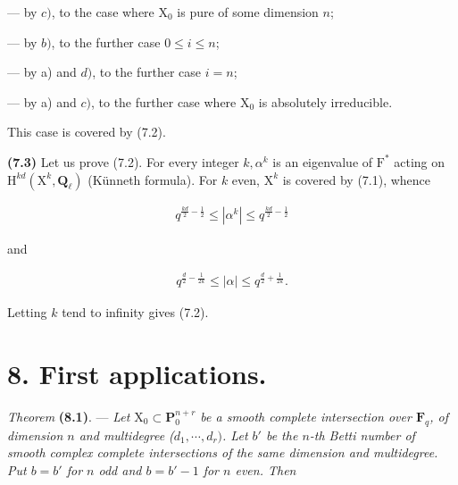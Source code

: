 \documentclass[10pt,leqno]{article}
\begin{document}
\noindent — by \(c)\), to the case where \(\mathrm{X}_{0}\) is pure of some dimension \(n\);\par

\noindent — by \(b)\), to the further case \(0\leq i\leq n\);\par

\noindent — by a) and \(d)\), to the further case \(i=n\);\par

\noindent — by a) and \(c)\), to the further case where \(\mathrm{X}_{0}\) is absolutely irreducible.\par

\noindent This case is covered by (7.2).\par

\noindent \textbf{(7.3)} Let us prove (7.2). For every integer \(k, \alpha ^{k}\) is an eigenvalue of \(\mathrm{F}^{*}\) acting on \(\mathrm{H}^{kd}(\mathrm{X}^{k},\mathbf{Q}_{\ell })\) (Künneth formula). For \(k\) even, \(\mathrm{X}^{k}\) is covered by (7.1), whence\par

\begin{equation*}\begin{gathered}q^{\frac{kd}{2}- \frac{1}{2}} \leq  |\alpha ^{k}| \leq  q^{\frac{kd}{2}- \frac{1}{2}}\end{gathered}\end{equation*}

\noindent and\par

\begin{equation*}\begin{gathered}q^{\frac{d}{2}- \frac{1}{2k}} \leq  |\alpha | \leq  q^{\frac{d}{2}+\frac{1}{2k}}.\end{gathered}\end{equation*}

\noindent Letting \(k\) tend to infinity gives (7.2).\par

\section*{8. First applications.}

\noindent \emph{Theorem} \textbf{(8.1)}. — {\itshape Let \(\mathrm{X}_{0}\subset \mathbf{P}_{0}^{n+r}\) be a smooth complete intersection over \(\mathbf{F}_{q}\), of dimension \(n\) and multidegree (\(d_{1},\cdots ,d_{r})\). Let \(b'\) be the \(n\)-th Betti number of smooth complex complete intersections of the same dimension and multidegree. Put \(b=b'\) for \(n\) odd and \(b=b'- 1\) for \(n\) even. Then}\par
\end{document}
